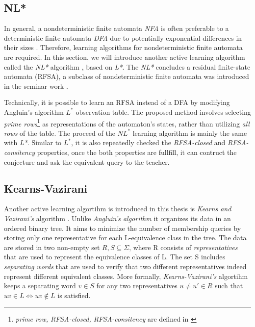 \subsection{NL*}
In general, a nondeterministic finite automata \textit{NFA} is often preferable to a 
deterministic finite automata \textit{DFA} due to potentially exponential 
differences in their sizes \cite*{ozols2005size}.
Therefore, learning algorithms for nondeterministic finite automata are required.
In this section, we will introduce another active learning algorithm called the \textit{NL*} algorithm \cite*{Bollig2009AngluinStyleLO},
based on \textit{L*}. The \textit{NL*} concludes a residual finite-state automata (RFSA), 
a subclass of nondeterministic finite automata was introduced in the seminar work \cite*{10.1007/3-540-44693-1_13}.

Technically, it is possible to learn an RFSA instead of a DFA by modifying Angluin's algorithm $L^*$ observation table.
The proposed method involves selecting \textit{prime rows}\footnote{\label{notenl}\textit{prime row, RFSA-closed, RFSA-consitency} are defined in \cite{Bollig2009AngluinStyleLO}} as representations of the automaton's states, 
rather than utilizing \textit{all rows} of the table. 
The proceed of the \textit{$NL^*$} learning algorithm is mainly the same with \textit{L*}.
Similar to \textit{$L^*$}, it is also repeatedly checked the \textit{RFSA-closed}
and \textit{RFSA-consitency} properties, once the both properties are fullfill, 
it can contruct the conjecture and ask the equivalent query to the teacher.

\subsection{Kearns-Vazirani}
Another active learning algortihm is introduced in this thesis is \textit{Kearns and Vazirani's} algorithm \cite*{kearns1994introduction}.
Unlike \textit{Angluin's algorithm} it organizes its data in an ordered binary tree. 
It aims to minimize the number of membership queries by storing only one representative for 
each L-equivalence class in the tree.
The data are stored in two non-empty set $R, S \subseteq \Sigma$, where R consists
of \textit{representatives} that are used to represent the equivalence classes of L.
The set S includes \textit{separating words} that are used to verify that two 
different representatives indeed represent different equivalent classes.
More formally, \textit{Kearns-Vazirani's} algortihm keeps a separating word $v \in S$
for any two  representatives $u \ne u' \in R$ such that $uv \in L \Leftrightarrow uv \notin L$ is satisfied.

